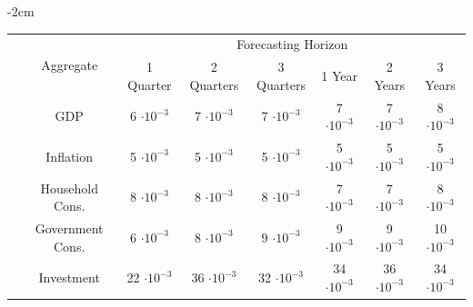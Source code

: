 \documentclass[12pt]{article}
\begin{document}
\begin{table}[ht]
    \centering
    \addtolength{\leftskip} {-2cm} %
    \addtolength{\rightskip}{-2cm}
    \begin{tabular}{ c|c| c c c c c c|}
    \hline
        & \multirow{2}{*}{Aggregate} & \multicolumn{6}{|c|}{Forecasting Horizon} \\
         & & 1 Quarter & 2 Quarters & 3 Quarters & 1 Year & 2 Years & 3 Years \\
        \hline
\parbox[t]{5mm}{}
& GDP  & 6 $\cdot 10^{-3}$  & 7 $\cdot 10^{-3}$  & 7 $\cdot 10^{-3}$  & 7 $\cdot 10^{-3}$  & 7 $\cdot 10^{-3}$  & 8 $\cdot 10^{-3}$ \\
& Inflation  & 5 $\cdot 10^{-3}$  & 5 $\cdot 10^{-3}$  & 5 $\cdot 10^{-3}$  & 5 $\cdot 10^{-3}$  & 5 $\cdot 10^{-3}$  & 5 $\cdot 10^{-3}$ \\
& Household Cons.  & 8 $\cdot 10^{-3}$  & 8 $\cdot 10^{-3}$  & 8 $\cdot 10^{-3}$  & 7 $\cdot 10^{-3}$  & 7 $\cdot 10^{-3}$  & 8 $\cdot 10^{-3}$ \\
& Government Cons.  & 6 $\cdot 10^{-3}$  & 8 $\cdot 10^{-3}$  & 9 $\cdot 10^{-3}$  & 9 $\cdot 10^{-3}$  & 9 $\cdot 10^{-3}$  & 10 $\cdot 10^{-3}$ \\
& Investment  & 22 $\cdot 10^{-3}$  & 36 $\cdot 10^{-3}$  & 32 $\cdot 10^{-3}$  & 34 $\cdot 10^{-3}$  & 36 $\cdot 10^{-3}$  & 34 $\cdot 10^{-3}$ \\
\hline


\end{tabular}
\end{table}
\end{document}
